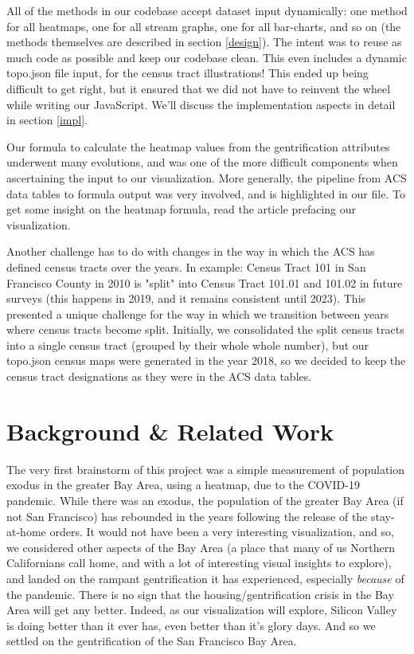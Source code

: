 \documentclass{article}
\begin{document}
    All of the methods in our codebase accept dataset input dynamically: one method for all heatmaps, one for all stream graphs, one for all bar-charts, and so on (the methods themselves are described in section \ref{design}). The intent was to reuse as much code as possible and keep our codebase clean. This even includes a dynamic topo.json file input, for the census tract illustrations! This ended up being difficult to get right, but it ensured that we did not have to reinvent the wheel while writing our JavaScript. We'll discuss the implementation aspects in detail in section \ref{impl}.
     
    Our formula to calculate the heatmap values from the gentrification attributes underwent many evolutions, and was one of the more difficult components when ascertaining the input to our visualization. More generally, the pipeline from ACS data tables to formula output was very involved, and is highlighted in our  file. To get some insight on the heatmap formula, read the article prefacing our visualization. 

    Another challenge has to do with changes in the way in which the ACS has defined census tracts over the years. In example: Census Tract 101 in San Francisco County in 2010 is "split" into Census Tract 101.01 and 101.02 in future surveys (this happens in 2019, and it remains consistent until 2023). This presented a unique challenge for the way in which we transition between years where census tracts become split. Initially, we consolidated the split census tracts into a single census tract (grouped by their whole whole number), but our topo.json census maps were generated in the year 2018, so we decided to keep the census tract designations as they were in the ACS data tables.

\section{Background \& Related Work}

    The very first brainstorm of this project was a simple measurement of population exodus in the greater Bay Area, using a heatmap, due to the COVID-19 pandemic. While there was an exodus, the population of the greater Bay Area (if not San Francisco) has rebounded in the years following the release of the stay-at-home orders. It would not have been a very interesting visualization, and so, we considered other aspects of the Bay Area (a place that many of us Northern Californians call home, and with a lot of interesting visual insights to explore), and landed on the rampant gentrification it has experienced, especially \textit{because} of the pandemic. There is no sign that the housing/gentrification crisis in the Bay Area will get any better. Indeed, as our visualization will explore, Silicon Valley is doing better than it ever has, even better than it's glory days. And so we settled on the gentrification of the San Francisco Bay Area.
\end{document}
